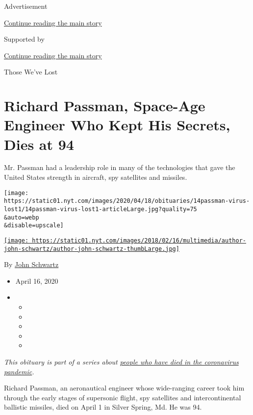 Advertisement

\protect\hyperlink{after-top}{Continue reading the main story}

Supported by

\protect\hyperlink{after-sponsor}{Continue reading the main story}

Those We've Lost

\hypertarget{richard-passman-space-age-engineer-who-kept-his-secrets-dies-at-94}{%
\section{Richard Passman, Space-Age Engineer Who Kept His Secrets, Dies
at
94}\label{richard-passman-space-age-engineer-who-kept-his-secrets-dies-at-94}}

Mr. Passman had a leadership role in many of the technologies that gave
the United States strength in aircraft, spy satellites and missiles.

\texttt{[image: https://static01.nyt.com/images/2020/04/18/obituaries/14passman-virus-lost1/14passman-virus-lost1-articleLarge.jpg?quality=75\\\&auto=webp\\\&disable=upscale]}

\href{https://www.nytimes.com/by/john-schwartz}{\texttt{[image: https://static01.nyt.com/images/2018/02/16/multimedia/author-john-schwartz/author-john-schwartz-thumbLarge.jpg]}}

By \href{https://www.nytimes.com/by/john-schwartz}{John Schwartz}

\begin{itemize}
\item
  April 16, 2020
\item
  \begin{itemize}
  \item
  \item
  \item
  \item
  \item
  \end{itemize}
\end{itemize}

\emph{This obituary is part of a series about}
\href{https://www.nytimes.com/series/people-who-have-died-of-the-coronavirus}{\emph{people
who have died in the coronavirus pandemic}}\emph{.}

Richard Passman, an aeronautical engineer whose wide-ranging career took
him through the early stages of supersonic flight, spy satellites and
intercontinental ballistic missiles, died on April 1 in Silver Spring,
Md. He was 94.


